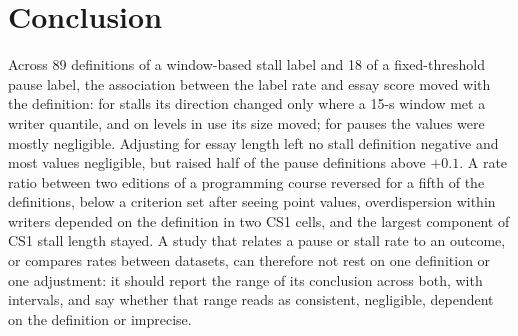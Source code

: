 \section{Conclusion}
\label{sec:conclusion}

Across 89 definitions of a window-based stall label and 18 of a fixed-threshold pause label, the association between
the label rate and essay score moved with the definition: for stalls its direction changed only where a 15-s window
met a writer quantile, and on levels in use its size moved; for pauses the values were mostly negligible. Adjusting for
essay length left no stall definition negative and most values negligible, but raised half of the pause definitions
above $+0.1$. A rate ratio between two editions of a programming course reversed for a fifth of the definitions, below a
criterion set after seeing point values, overdispersion within writers depended on the definition in two CS1 cells,
and the largest component of CS1 stall length stayed. A study that relates a pause or stall rate to an outcome, or
compares rates between datasets, can therefore not rest on one definition or one adjustment: it should report the range
of its conclusion across both, with intervals, and say whether that range reads as consistent, negligible, dependent on
the definition or imprecise.
